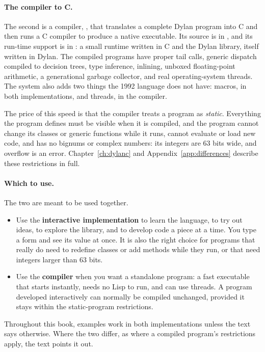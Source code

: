 \paragraph{The compiler to C.}
The second is a compiler, , that translates a complete
Dylan program into C and then runs a C compiler to produce a native
executable. Its source is in , and its run-time support is
in : a small runtime written in C and the Dylan library,
itself written in Dylan. The compiled programs have proper tail calls,
generic dispatch compiled to decision trees, type inference, inlining,
unboxed floating-point arithmetic, a generational garbage collector,
and real operating-system threads. The system also adds two things the
1992 language does not have: macros, in both implementations, and
threads, in the compiler.

The price of this speed is that the compiler treats a program as
\emph{static}. Everything the program defines must be visible when it is
compiled, and the program cannot change its classes or generic functions
while it runs, cannot evaluate or load new code, and has no bignums or
complex numbers: its integers are 63 bits wide, and overflow is an error.
Chapter~\ref{ch:dylanc} and Appendix~\ref{app:differences} describe these
restrictions in full.

\paragraph{Which to use.} The two are meant to be used together.

\begin{itemize}
\item Use the \textbf{interactive implementation} to learn the language, to
  try out ideas, to explore the library, and to develop code a piece at a
  time. You type a form and see its value at once. It is also the right
  choice for programs that really do need to redefine classes or add
  methods while they run, or that need integers larger than 63 bits.
\item Use the \textbf{compiler} when you want a standalone program: a fast
  executable that starts instantly, needs no Lisp to run, and can use
  threads. A program developed interactively can normally be compiled
  unchanged, provided it stays within the static-program restrictions.
\end{itemize}

Throughout this book, examples work in both implementations unless the
text says otherwise. Where the two differ, as where a compiled program's
restrictions apply, the text points it out.

